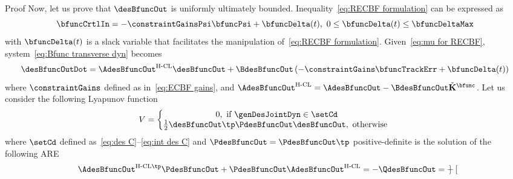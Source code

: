 \begin{custumProof}{Proof}
	Now, let us prove that $\desBfuncOut $ is uniformly ultimately bounded. Inequality~\cref{eq:RECBF formulation} can be expressed as
	\begin{equation}\label{eq:mu for RECBF}
		\bfuncCrtlIn = -\constraintGainsPsi\bfuncPsi + \bfuncDelta(t), \ 0\leq\bfuncDelta(t)\leq\bfuncDeltaMax
	\end{equation}
	with $\bfuncDelta(t)$ is a slack variable that facilitates the manipulation of~\cref{eq:RECBF formulation}. Given~\cref{eq:mu for RECBF}, system~\cref{eq:Bfunc transverse dyn} becomes
	\begin{equation}\label{eq:bfunc des dynamics - perturbed system}
		\desBfuncOutDot = \AdesBfuncOut^{\text{H-CL}}\desBfuncOut + \BdesBfuncOut\left(-\constraintGains\bfuncTrackErr+\bfuncDelta(t)\right) 
	\end{equation}
	where $\constraintGains$ defined as in~\cref{eq:ECBF gains}, and $\AdesBfuncOut^{\text{H-CL}}= \AdesBfuncOut-\BdesBfuncOut\check{\mathbf{K}}^{\bfunc}$. Let us consider the following Lyapunov function~\cite{xu2015ifac}
	\begin{equation}\label{eq:Lyapunov function for RECBF}
		V= \left\{\begin{matrix}
			0, \text{ if } \genDesJointDyn\in\setCd\\
			\frac{1}{2}\desBfuncOut\tp\PdesBfuncOut\desBfuncOut, \text{ otherwise } %
		\end{matrix}\right.
	\end{equation}
	where $\setCd$ defined as~\cref{eq:des C}--\cref{eq:int des C} and $\PdesBfuncOut=\PdesBfuncOut\tp$ positive-definite is the solution of the following ARE
	\begin{equation}\label{eq:riccati eq for RECBF}
		\AdesBfuncOut^{{\text{H-CL}}\tp}\PdesBfuncOut + \PdesBfuncOut \AdesBfuncOut^{\text{H-CL}} = -\QdesBfuncOut = -\begin{bmatrix}

\end{bmatrix}
\end{equation}
\end{custumProof}
